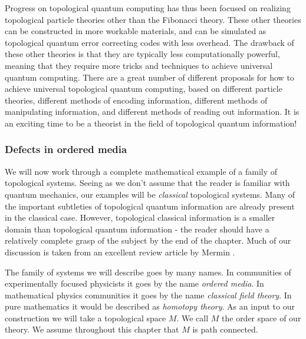 Progress on topological quantum computing has thus been focused on realizing topological particle theories other than the Fibonacci theory. These other theories can be constructed in more workable materials, and can be simulated as topological quantum error correcting codes with less overhead. The drawback of these other theories is that they are typically less computationally powerful, meaning that they require more tricks and techniques to achieve universal quantum computing. There are a great number of different proposals for how to achieve universal topological quantum computing, based on different particle theories, different methods of encoding information, different methods of manipulating information, and different methods of reading out information. It is an exciting time to be a theorist in the field of topological quantum information!

\subsubsection{Defects in ordered media}

We will now work through a complete mathematical example of a family of topological systems. Seeing as we don't assume that the reader is familiar with quantum mechanics, our examples will be \textit{classical} topological systems. Many of the important subtleties of topological quantum information are already present in the classical case. However, topological classical information is a smaller domain than topological quantum information - the reader should have a relatively complete grasp of the subject by the end of the chapter. Much of our discussion is taken from an excellent review article by Mermin \cite{mermin1979topological}.

The family of systems we will describe goes by many names. In communities of experimentally focused physicists it goes by the name \textit{ordered media}. In mathematical physics communities it goes by the name \textit{classical field theory}. In pure mathematics it would be described as \textit{homotopy theory}. As an input to our construction we will take a topological space $M$. We call $M$ the order space of our theory. We assume throughout this chapter that $M$ is path connected.

